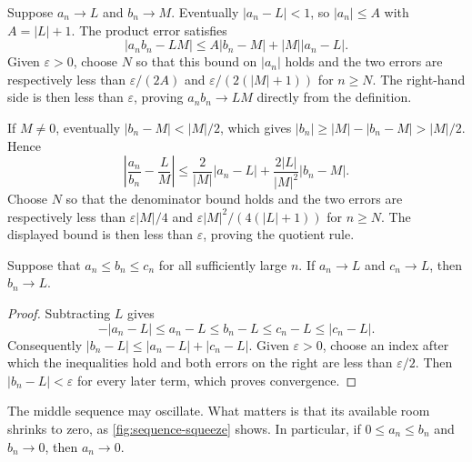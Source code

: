 \begin{example}
  \label{ex:analysis-i:limit-law-bounds}
  Suppose $a_n\to L$ and $b_n\to M$. Eventually $|a_n-L|<1$, so
  $|a_n|\le A$ with $A=|L|+1$. The product error satisfies
  \[
    |a_nb_n-LM|\le A|b_n-M|+|M||a_n-L|.
  \]
  Given $\varepsilon>0$, choose $N$ so that this bound on $|a_n|$
  holds and the two errors are respectively less than
  $\varepsilon/(2A)$ and $\varepsilon/(2(|M|+1))$ for $n\ge N$.
  The right-hand side is then less than $\varepsilon$, proving
  $a_nb_n\to LM$ directly from the definition.

  If $M\ne0$, eventually $|b_n-M|<|M|/2$, which gives
  $|b_n|\ge |M|-|b_n-M|>|M|/2$. Hence
  \[
    \left|\frac{a_n}{b_n}-\frac{L}{M}\right|
    \le\frac{2}{|M|}|a_n-L|
      +\frac{2|L|}{|M|^2}|b_n-M|.
  \]
  Choose $N$ so that the denominator bound holds and the two errors
  are respectively less than $\varepsilon|M|/4$ and
  $\varepsilon|M|^2/(4(|L|+1))$ for $n\ge N$. The displayed
  bound is then less than $\varepsilon$, proving the quotient rule.
\end{example}

\begin{theorem}
  \label{thm:analysis-i:squeeze}
  Suppose that $a_n\le b_n\le c_n$ for all sufficiently large $n$.
  If $a_n\to L$ and $c_n\to L$, then $b_n\to L$.
\end{theorem}

\begin{proof}
  Subtracting $L$ gives
  \[
    -|a_n-L|\le a_n-L\le b_n-L\le c_n-L\le |c_n-L|.
  \]
  Consequently $|b_n-L|\le |a_n-L|+|c_n-L|$. Given
  $\varepsilon>0$, choose an index after which the inequalities hold and
  both errors on the right are less than $\varepsilon/2$. Then
  $|b_n-L|<\varepsilon$ for every later term, which proves convergence.
\end{proof}

The middle sequence may oscillate. What matters is that its available
room shrinks to zero, as \autoref{fig:sequence-squeeze} shows.
In particular, if $0\le a_n\le b_n$ and $b_n\to0$, then $a_n\to0$.

\begin{marginfigure}
  \centering
  
  \caption[An oscillating sequence squeezed between two bounds.]{The terms $b_n=1+(-1)^n/(2n)$ are trapped between
    $a_n=1-1/n$ and $c_n=1+1/n$. The gray curves guide the eye.
    The sequence terms are discrete. Both bounds tend to $1$.}
  \label{fig:sequence-squeeze}
\end{marginfigure}

